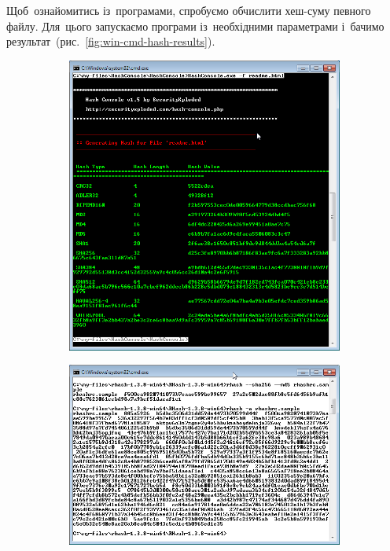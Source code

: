 \documentclass[
	a4paper,
	oneside,
	BCOR = 10mm,
	DIV = 12,
	12pt,
	headings = normal,
]{scrartcl}
\newlength{\gridunitwidth}
\begin{document}
			Щоб~ознайомитись із~програмами, спробуємо обчислити хеш-суму певного файлу. Для~цього запускаємо програми із~необхідними параметрами і~бачимо результат~(рис.~\ref{fig:win-cmd-hash-results}).

			\begin{figure}[!htbp]
				\begin{subfigure}[b]{6\gridunitwidth - 1em / 2}
					\centering
					\includegraphics[width = \columnwidth]{./assets/01.png}
					\caption{}
					\label{subfig:win-cmd-hash-results-hashconsole}
				\end{subfigure}%
				\hspace{1em}
				\begin{subfigure}[b]{6\gridunitwidth - 1em / 2}
					\centering
					\includegraphics[width = \columnwidth]{./assets/02.png}

\end{subfigure}
\end{figure}
\end{document}
